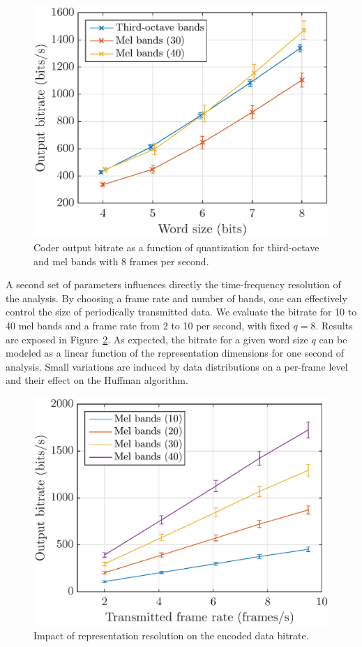 \documentclass[final,3p,times,twocolumn]{elsarticle}
\begin{document}
\begin{figure}[htbp]
	\centering
		\includegraphics[width=\columnwidth]{figures/bitrate_qall.eps}
	\caption{Coder output bitrate as a function of quantization for third-octave and mel bands with 8 frames per second.}
	\label{fig:bitrate_q}
\end{figure}

A second set of parameters influences directly the time-frequency resolution of the analysis. By choosing a frame rate and number of bands, one can effectively control the size of periodically transmitted data. We evaluate the bitrate for 10 to 40 mel bands and a frame rate from 2 to 10 per second, with fixed $q = 8$. Results are exposed in Figure~\ref{fig:bitrate_mel_avg}. As expected, the bitrate for a given word size $q$ can be modeled as a linear function of the representation dimensions for one second of analysis. Small variations are induced by data distributions on a per-frame level and their effect on the Huffman algorithm.

\begin{figure}[htbp]
	\centering
		\includegraphics[width=\columnwidth]{figures/bitrate_mel_avg.eps}
	\caption{Impact of representation resolution on the encoded data bitrate.}
	\label{fig:bitrate_mel_avg}
\end{figure}
\end{document}
